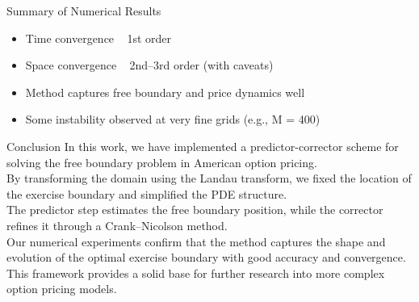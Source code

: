 \documentclass{beamer}
\begin{document}
\begin{frame}{Summary of Numerical Results}
  \begin{itemize}
    \item Time convergence ~ 1st order
    \item Space convergence ~ 2nd--3rd order (with caveats)
    \item Method captures free boundary and price dynamics well
    \item Some instability observed at very fine grids (e.g., M = 400)
  \end{itemize}
\end{frame}

\begin{frame}{Conclusion}
  In this work, we have implemented a predictor-corrector scheme for solving the free boundary problem in American option pricing. \\[1ex]
  By transforming the domain using the Landau transform, we fixed the location of the exercise boundary and simplified the PDE structure. \\[1ex]
  The predictor step estimates the free boundary position, while the corrector refines it through a Crank–Nicolson method. \\[1ex]
  Our numerical experiments confirm that the method captures the shape and evolution of the optimal exercise boundary with good accuracy and convergence. \\[1ex]
  This framework provides a solid base for further research into more complex option pricing models.
\end{frame}
\end{document}
